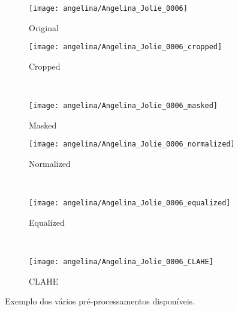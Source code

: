 \begin{figure}
        \centering
        \begin{subfigure}[b]{0.2\textwidth}
                \centering
                \texttt{[image: angelina/Angelina\_Jolie\_0006]}
                \caption{Original}
                \label{fig:original} 
        \end{subfigure}%
%

        \begin{subfigure}[b]{0.2\textwidth}
                \centering
                \texttt{[image: angelina/Angelina\_Jolie\_0006\_cropped]}
                \caption{Cropped}
                \label{fig:cropped} 
        \end{subfigure}
        ~ ~
        \begin{subfigure}[b]{0.2\textwidth}
                \centering
                \texttt{[image: angelina/Angelina\_Jolie\_0006\_masked]}
                \caption{Masked}
                \label{fig:masked}
        \end{subfigure}%
%

        \begin{subfigure}[b]{0.2\textwidth}
                \centering
                \texttt{[image: angelina/Angelina\_Jolie\_0006\_normalized]}
                \caption{Normalized}
                \label{fig:normalized} 
        \end{subfigure}
        ~ ~
        \begin{subfigure}[b]{0.2\textwidth}
                \centering
                \texttt{[image: angelina/Angelina\_Jolie\_0006\_equalized]}
                \caption{Equalized}
                \label{fig:equalized}
        \end{subfigure}
        ~ ~
        \begin{subfigure}[b]{0.2\textwidth}
                \centering
                \texttt{[image: angelina/Angelina\_Jolie\_0006\_CLAHE]}
                \caption{CLAHE}
                \label{fig:clahe}
        \end{subfigure}
        \caption{Exemplo dos vários pré-processamentos disponíveis.}
        \label{fig:galeriaspreprocessadas}   
\end{figure}


